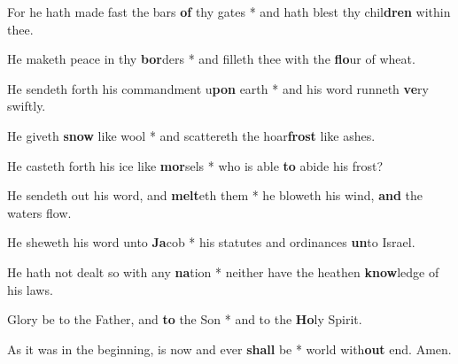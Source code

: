 \begin{multicols}{2}
	For he hath made fast the bars \textbf{of} thy gates * and hath blest thy chil\textbf{dren} within thee.
	
	He maketh peace in thy \textbf{bor}ders * and filleth thee with the \textbf{flo}ur of wheat.
	
	He sendeth forth his commandment u\textbf{pon} earth * and his word runneth \textbf{ve}ry swiftly.
	
	He giveth \textbf{snow} like wool * and scattereth the hoar\textbf{frost} like ashes.
	
	He casteth forth his ice like \textbf{mor}sels * who is able \textbf{to} abide his frost?
	
	He sendeth out his word, and \textbf{melt}eth them * he bloweth his wind, \textbf{and} the waters flow.
	
	He sheweth his word unto \textbf{Ja}cob * his statutes and ordinances \textbf{un}to Israel.
	
	He hath not dealt so with any \textbf{na}tion * neither have the heathen \textbf{know}ledge of his laws.
	
	Glory be to the Father, and \textbf{to} the Son * and to the \textbf{Ho}ly Spirit.
	
	As it was in the beginning, is now and ever \textbf{shall} be * world with\textbf{out} end. Amen.
\end{multicols}